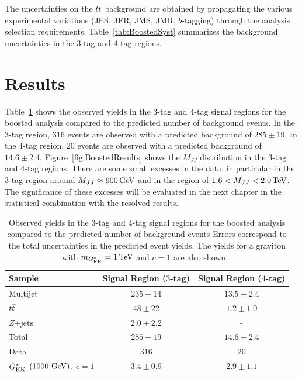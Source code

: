 The uncertainties on the $t\bar{t}$ background are obtained by propagating the various experimental variations (JES, JER, JMS, JMR, $b$-tagging) through the analysis selection requirements. Table~\ref{tab:BoostedSyst} summarizes the background uncertainties in the $3$-tag and $4$-tag regions. 

\section{Results}

Table~\ref{tab:BoostedResults} shows the observed yields in the $3$-tag and $4$-tag signal regions for the boosted analysis compared to the predicted number of background events. In the $3$-tag region, $316$ events are observed with a predicted background of $285\pm19$. In the $4$-tag region, $20$ events are observed with a predicted background of $14.6\pm 2.4$. Figure~\ref{fig:BoostedResults} shows the $M_{JJ}$ distribution in the $3$-tag and $4$-tag regions. There are some small excesses in the data, in particular in the $3$-tag region around $M_{JJ} \approx 900 \GeV$ and in the region of $1.6 < M_{JJ} < 2.0 \TeV$. The significance of these excesses will be evaluated in the next chapter in the statistical combination with the resolved results. 

\begin{table}[!htb]
\begin{center}
\begin{tabular}{ l c c }
\toprule
 Sample  & Signal Region ($3$-tag)    & Signal Region ($4$-tag) \\ 
\midrule
Multijet &  $235  \pm 14$       & $13.5 \pm 2.4$ \\
$t\bar{t}$   &  $48   \pm 22$       & $1.2  \pm 1.0$ \\
$Z$+jets &  $2.0  \pm 2.2$      &       -        \\
\midrule
Total    &  $285  \pm 19$       & $14.6 \pm 2.4$ \\
 \midrule
Data   &  $316$                 & $20$ \\
\midrule
$G^*_{\rm KK}$ $\left(1000\,\GeV{}\right)$, $c = 1$ & $3.4 \pm 0.9$  & $2.9 \pm 1.1$ \\
\bottomrule
\end{tabular}
\caption{Observed yields in the $3$-tag and $4$-tag signal regions for the boosted analysis compared to the predicted number of background events
  Errors correspond to the total uncertainties in the predicted event yields. The yields for a graviton with $m_{\Gkk} = 1\TeV$ and $c = 1$ are also shown.~\cite{4bconf}}
\label{tab:BoostedResults} 
\end{center}
\end{table}

